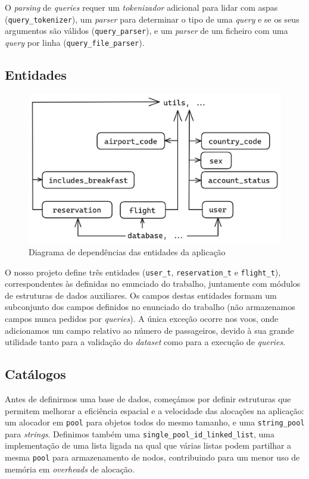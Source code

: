 \documentclass[12pt, a4paper]{article}
\begin{document}
O \emph{parsing} de \emph{queries} requer um \emph{tokenizador} adicional para lidar com aspas
(\texttt{query\_tokenizer}), um \emph{parser} para determinar o tipo de uma \emph{query} e se os
seus argumentos são válidos (\texttt{query\_parser}), e um \emph{parser} de um ficheiro com uma
\emph{query} por linha (\texttt{query\_file\_parser}).

\subsection{Entidades}
\label{sec:entities}

\begin{figure}[ht]
    \centering
    \includegraphics[scale=0.2]{res/entities.png}
    \caption{Diagrama de dependências das entidades da aplicação}
    \label{fig:entities}
\end{figure}

O nosso projeto define três entidades (\texttt{user\_t}, \texttt{reservation\_t} e
\texttt{flight\_t}), correspondentes às definidas no enunciado do trabalho, juntamente com módulos
de estruturas de dados auxiliares. Os campos destas entidades formam um subconjunto dos campos
definidos no enunciado do trabalho (não armazenamos campos nunca pedidos por \emph{queries}). A
única exceção ocorre nos voos, onde adicionamos um campo relativo ao número de passageiros, devido
à sua grande utilidade tanto para a validação do \emph{dataset} como para a execução de
\emph{queries}.

\subsection{Catálogos}
\label{sec:catalogs}

Antes de definirmos uma base de dados, começámos por definir estruturas que permitem melhorar a
eficiência espacial e a velocidade das alocações na aplicação: um alocador em \texttt{pool} para
objetos todos do mesmo tamanho, e uma \texttt{string\_pool} para \emph{strings}. Definimos também
uma \texttt{single\_pool\_id\_linked\_list}, uma implementação de uma lista ligada na qual que
várias listas podem partilhar a mesma \texttt{pool} para armazenamento de nodos, contribuindo para
um menor uso de memória em \emph{overheads} de alocação.
\end{document}
